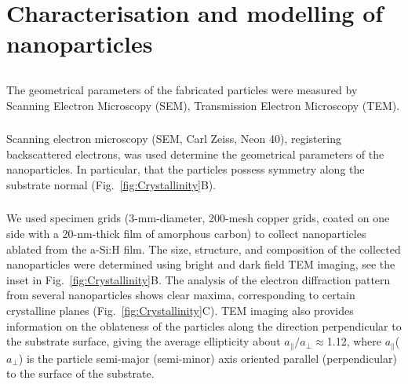 \section{Characterisation and modelling of nanoparticles}
\label{ch:Exp}

    \subsection{}
    \label{sec:SEM}
            The geometrical parameters of the fabricated particles were measured by Scanning Electron Microscopy (SEM),
        Transmission Electron Microscopy (TEM).

        \subsubsection{}
                Scanning electron microscopy (SEM, Carl Zeiss, Neon 40), registering backscattered electrons, was used
            determine the geometrical parameters of the nanoparticles. In particular, that the particles possess 
            symmetry along the substrate normal (Fig.~\ref{fig:Crystallinity}B).

        \subsubsection{}
                We used specimen grids (3-mm-diameter, 200-mesh copper grids, coated on one side with a 20-nm-thick film
            of amorphous carbon) to collect nanoparticles ablated from the a-Si:H film. The size, structure, and composition
            of the collected nanoparticles were determined using bright and dark field TEM imaging, see the inset in
            Fig.~\ref{fig:Crystallinity}B. The analysis of the electron diffraction pattern from several nanoparticles shows clear maxima,
            corresponding to certain crystalline planes (Fig.~\ref{fig:Crystallinity}C).  TEM imaging also provides information
            on the oblateness of the particles along the direction perpendicular to the substrate surface, giving
            the average ellipticity about $a_{\parallel}/a_{\perp}\approx$1.12, where $a_{\parallel}$($a_{\perp}$) is
            the particle semi-major (semi-minor) axis oriented parallel (perpendicular) to the surface of the substrate.

